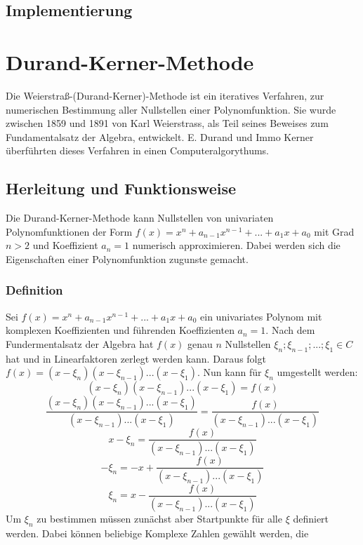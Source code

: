 \documentclass[12pt]{article}
\begin{document}
    \subsection{Implementierung}

\section{Durand-Kerner-Methode} 
    Die Weierstraß-(Durand-Kerner)-Methode ist ein iteratives Verfahren, zur numerischen Bestimmung aller Nullstellen einer Polynomfunktion. Sie wurde zwischen 1859 und 1891 von Karl Weierstrass, als Teil seines Beweises zum Fundamentalsatz der Algebra, entwickelt. E. Durand und Immo Kerner überführten dieses Verfahren in einen Computeralgorythums.

    \subsection{Herleitung und Funktionsweise}
        Die Durand-Kerner-Methode kann Nullstellen von univariaten Polynomfunktionen der Form $f(x) = x^n + a_{n-1} x^{n-1} + ... + a_1 x + a_0$ mit Grad $n > 2$ und Koeffizient $a_n = 1$ numerisch approximieren. Dabei werden sich die Eigenschaften einer Polynomfunktion zugunste gemacht.
    \subsubsection{Definition}
        Sei $f(x) = x^n + a_{n-1} x^{n-1} + ... + a_1 x + a_0$ ein univariates Polynom mit komplexen Koeffizienten und führenden Koeffizienten $a_n = 1$. Nach dem Fundermentalsatz der Algebra hat $f(x)$ genau $n$ Nullstellen $\xi_n;\xi_{n-1};...;\xi_1 \in C$ hat und in Linearfaktoren zerlegt werden kann. Daraus folgt $f(x) = (x - \xi_n)(x - \xi_{n-1})...(x - \xi_1)$. Nun kann für $\xi_n$ umgestellt werden:
        \begin{displaymath}
            (x - \xi_n)(x - \xi_{n-1})...(x - \xi_1) = f(x)
        \end{displaymath}
        \begin{displaymath}
            \frac{(x - \xi_n)(x - \xi_{n-1})...(x - \xi_1)}{(x - \xi_{n-1})...(x - \xi_1)} = \frac{f(x)}{(x - \xi_{n-1})...(x - \xi_1)}
        \end{displaymath}
        \begin{displaymath}
            x - \xi_n = \frac{f(x)}{(x - \xi_{n-1})...(x - \xi_1)}
        \end{displaymath}
        \begin{displaymath}
            - \xi_n = - x + \frac{f(x)}{(x - \xi_{n-1})...(x - \xi_1)}
        \end{displaymath}
        \begin{displaymath}
            \xi_n = x - \frac{f(x)}{(x - \xi_{n-1})...(x - \xi_1)}
        \end{displaymath}
        Um $\xi_n$ zu bestimmen müssen zunächst aber Startpunkte für alle $\xi$ definiert werden. Dabei können beliebige Komplexe Zahlen gewählt werden, die 
\end{document}
